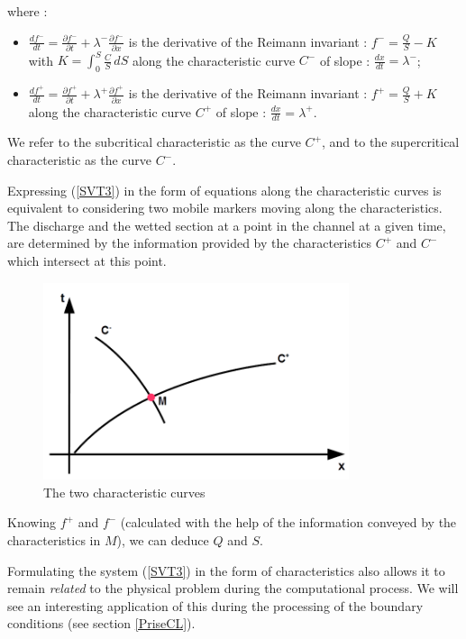 where :
\begin{itemize}
 \item $\frac{df^-}{dt} = \frac{\partial f^-}{\partial t} + \lambda^- \frac{\partial f^-}{\partial x}$ is the derivative of the Reimann invariant : $f^- = \frac{Q}{S} - K$ with $K = \int_{0}^S \frac{C}{S} \, dS$ along the characteristic curve $C^-$ of slope : $\frac{dx}{dt} = \lambda^-$;
 \item $\frac{df^+}{dt} = \frac{\partial f^+}{\partial t} + \lambda^+ \frac{\partial f^+}{\partial x}$ is the derivative of the Reimann invariant : $f^+ = \frac{Q}{S} + K$ along the characteristic curve $C^+$ of slope : $\frac{dx}{dt} = \lambda^+$.
\end{itemize}

We refer to the subcritical characteristic as the curve $C^+$, and to the supercritical characteristic as the curve $C^-$.

Expressing (\ref{SVT3}) in the form of equations along the characteristic curves is equivalent to considering two mobile markers moving along the characteristics. The discharge and the wetted section at a point in the channel at a given time, are determined by the information provided by the characteristics $C^+$ and $C^-$ which intersect at this point.

\begin{figure}[H]
 \begin{center}
  \includegraphics[width=0.8\textwidth]{Figures/2Carac.png}
  \caption{The two characteristic curves}
 \end{center}
\end{figure}

Knowing $f^+$ and $f^-$ (calculated with the help of the information conveyed by the characteristics in $M$), we can deduce $Q$ and $S$.

Formulating the system (\ref{SVT3}) in the form of characteristics also allows it to remain \textit{related} to the physical problem during the computational process. We will see an interesting application of this during the processing of the boundary conditions (see section \ref{PriseCL}).

